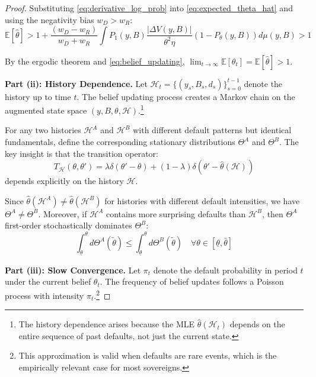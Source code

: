\documentclass[12pt]{article}
\theoremstyle{plain}
\begin{document}
\begin{proof}
	Substituting \eqref{eq:derivative_log_prob} into \eqref{eq:expected_theta_hat}
	and using the negativity bias $w_D > w_R$:
	\begin{equation}
		\mathbb{E}[\hat{\theta}] > 1 + \frac{(w_D - w_R)}{w_D + w_R} \int P_1(y,B) \frac{|\Delta V(y,B)|}{\theta^2\eta} (1-P_\theta(y,B)) d\mu(y,B) > 1 \label{eq:persistent_pessimism}
	\end{equation}

	By the ergodic theorem and \eqref{eq:belief_updating}, $\lim_{t \to \infty}
		\mathbb{E}[\theta_t] = \mathbb{E}[\hat{\theta}] > 1$.

	\textbf{Part (ii): History Dependence.}
	Let $\mathcal{H}_t = \{(y_s, B_s, d_s)\}_{s=0}^{t-1}$ denote the history up to time $t$. The belief updating process creates a Markov chain on the augmented state space $(y, B, \theta, \mathcal{H})$.\footnote{The history dependence arises because the MLE $\hat{\theta}(\mathcal{H}_t)$ depends on the entire sequence of past defaults, not just the current state.}

	For any two histories $\mathcal{H}^A$ and $\mathcal{H}^B$ with different
	default patterns but identical fundamentals, define the corresponding
	stationary distributions $\Theta^A$ and $\Theta^B$. The key insight is that the
	transition operator:
	\begin{equation}
		T_{\mathcal{H}}(\theta, \theta') = \lambda \delta(\theta' - \theta) + (1-\lambda) \delta(\theta' - \hat{\theta}(\mathcal{H}))
		\label{eq:transition_operator}
	\end{equation}
	depends explicitly on the history $\mathcal{H}$.

	Since $\hat{\theta}(\mathcal{H}^A) \neq \hat{\theta}(\mathcal{H}^B)$ for
	histories with different default intensities, we have $\Theta^A \neq \Theta^B$.
	Moreover, if $\mathcal{H}^A$ contains more surprising defaults than
	$\mathcal{H}^B$, then $\Theta^A$ first-order stochastically dominates
	$\Theta^B$:
	\begin{equation}
		\int_{\underline{\theta}}^{\theta} d\Theta^A(\tilde{\theta}) \leq \int_{\underline{\theta}}^{\theta} d\Theta^B(\tilde{\theta}) \quad \forall \theta \in [\underline{\theta}, \bar{\theta}] \label{eq:stochastic_dominance}
	\end{equation}

	\textbf{Part (iii): Slow Convergence.}
	Let $\pi_t$ denote the default probability in period $t$ under the current belief $\theta_t$. The frequency of belief updates follows a Poisson process with intensity $\pi_t$.\footnote{This approximation is valid when defaults are rare events, which is the empirically relevant case for most sovereigns.}


\end{proof}
\end{document}
